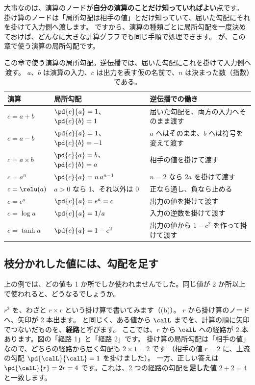 大事なのは、演算のノードが\textbf{自分の演算のことだけ知っていればよい}点です。
掛け算のノードは「局所勾配は相手の値」とだけ知っていて、届いた勾配にそれを掛けて入力側へ渡します。
ですから、演算の種類ごとに局所勾配を一度決めておけば、どんなに大きな計算グラフでも同じ手順で処理できます。
が、この章で使う演算の局所勾配です。

\begin{table}[tbp]
\centering
\caption{この章で使う演算の局所勾配。逆伝播では、届いた勾配にこれを掛けて入力側へ渡す。
$a$、$b$ は演算の入力、$c$ は出力を表す仮の名前で、$n$ は決まった数（指数）である。}
\label{tab:nn-local-grads}
\small
\begin{tabular}{lll}
\toprule
演算 & 局所勾配 & 逆伝播での働き \\
\midrule
$c=a+b$ & $\pd{c}{a}=1$、$\pd{c}{b}=1$ & 届いた勾配を、両方の入力へそのまま渡す \\[0.3mm]
$c=a-b$ & $\pd{c}{a}=1$、$\pd{c}{b}=-1$ & $a$ へはそのまま、$b$ へは符号を変えて渡す \\[0.3mm]
$c=a\times b$ & $\pd{c}{a}=b$、$\pd{c}{b}=a$ & 相手の値を掛けて渡す \\[0.3mm]
$c=a^{n}$ & $\pd{c}{a}=n\,a^{n-1}$ & $n=2$ なら $2a$ を掛けて渡す \\[0.3mm]
$c=\relu(a)$ & $a>0$ なら 1、それ以外は 0 & 正なら通し、負なら止める \\[0.5mm]
$c=e^{a}$ & $\pd{c}{a}=e^{a}=c$ & 出力の値を掛けて渡す \\[0.3mm]
$c=\log a$ & $\pd{c}{a}=1/a$ & 入力の逆数を掛けて渡す \\[0.3mm]
$c=\tanh a$ & $\pd{c}{a}=1-c^{2}$ & 出力の値から $1-c^{2}$ を作って掛けて渡す \\
\bottomrule
\end{tabular}
\end{table}

\subsection*{枝分かれした値には、勾配を足す}

上の例では、どの値も 1 か所でしか使われませんでした。同じ値が 2 か所以上で使われると、どうなるでしょうか。

$r^2$ を、わざと $r\times r$ という掛け算で書いてみます（(b)）。
$r$ から掛け算のノードへ、矢印が 2 本出ます。
と同じく、ある値から $\calL$ までを、計算の順に矢印でつないだものを、\textbf{経路}と呼びます。
ここでは、$r$ から $\calL$ への経路が 2 本あります。図の「経路 1」と「経路 2」です。
掛け算の局所勾配は「相手の値」なので、どちらの経路から届く勾配も $2\times 1=2$ です
（相手の値 $r=2$ に、上流の勾配 $\pd{\calL}{\calL}=1$ を掛けました）。
一方、正しい答えは $\pd{\calL}{r}=2r=4$ です。これは、2 つの経路の勾配を\textbf{足した}値 $2+2=4$ と一致します。

